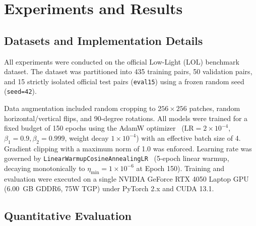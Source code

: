 \documentclass[journal,onecolumn,11pt]{IEEEtran}
\begin{document}
\section{Experiments and Results}

\subsection{Datasets and Implementation Details}
All experiments were conducted on the official Low-Light (LOL) benchmark dataset. The dataset was partitioned into 435 training pairs, 50 validation pairs, and 15 strictly isolated official test pairs (\texttt{eval15}) using a frozen random seed (\texttt{seed=42}). 

Data augmentation included random cropping to $256\times 256$ patches, random horizontal/vertical flips, and 90-degree rotations. All models were trained for a fixed budget of 150 epochs using the AdamW optimizer~\cite{loshchilov2017decoupled} ($\text{LR}=2\times 10^{-4}$, $\beta_1=0.9, \beta_2=0.999$, weight decay $1\times 10^{-4}$) with an effective batch size of 4. Gradient clipping with a maximum norm of 1.0 was enforced. Learning rate was governed by \texttt{LinearWarmupCosineAnnealingLR}~\cite{loshchilov2016sgdr} (5-epoch linear warmup, decaying monotonically to $\eta_{\min}=1\times 10^{-6}$ at Epoch 150). Training and evaluation were executed on a single NVIDIA GeForce RTX 4050 Laptop GPU (6.00~GB GDDR6, 75W TGP) under PyTorch 2.x and CUDA 13.1.

\subsection{Quantitative Evaluation}
\end{document}
